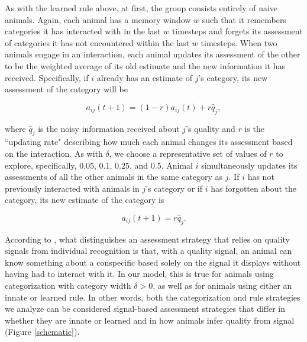 As with the learned rule above, at first, the group consists entirely of naive animals. Again, each animal has a memory window $w$ such that it remembers categories it has interacted with in the last $w$ timesteps and forgets its assessment of categories it has not encountered within the last $w$ timesteps. When two animals engage in an interaction, each animal updates its assessment of the other to be the weighted average of its old estimate and the new information it has received. Specifically, if $i$ already has an estimate of $j$'s category, its new assessment of the category will be
\begin{linenomath*}
\begin{equation*}
a_{ij}(t+1)=(1-r)a_{ij}(t)+r\hat{q}_j,
\end{equation*}
\end{linenomath*}
where $\hat{q}_j$ is the noisy information received about $j$'s quality and $r$ is the ``updating rate" describing how much each animal changes its assessment based on the interaction. As with $\delta$, we choose a representative set of values of $r$ to explore, specifically, $0.05$, $0.1$, $0.25$, and $0.5$. Animal $i$ simultaneously updates its assessments of all the other animals in the same category as $j$.
If $i$ has not previously interacted with animals in $j$'s category or if $i$ has forgotten about the category, its new estimate of the category is
\begin{linenomath*}
\begin{equation*}
a_{ij}(t+1)=r\hat{q}_j.
\end{equation*}
\end{linenomath*}

According to \citet{sheehan2016evotradeoff}, what distinguishes an assessment strategy that relies on quality signals from individual recognition is that, with a quality signal, an animal can know something about a conspecific based solely on the signal it displays without having had to interact with it. In our model, this is true for animals using categorization with category width $\delta>0$, as well as for animals using either an innate or learned rule. In other words, both the categorization and rule strategies we analyze can be considered signal-based assessment strategies that differ in whether they are innate or learned and in how animals infer quality from signal (Figure \ref{schematic}). 
 
